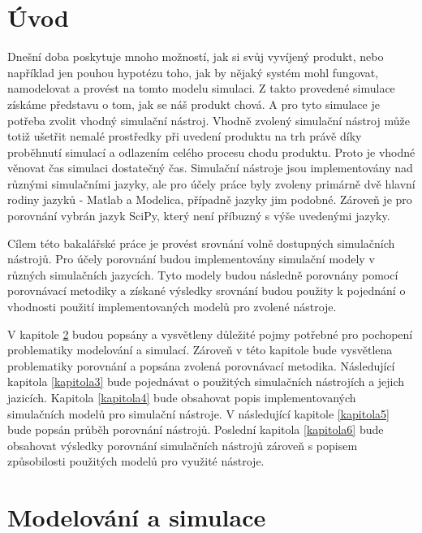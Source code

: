 \chapter{Úvod}

Dnešní doba poskytuje mnoho možností, jak si svůj vyvíjený produkt, nebo například jen pouhou hypotézu toho, jak by nějaký systém mohl fungovat, namodelovat a provést na tomto modelu simulaci. Z takto provedené simulace získáme představu o tom, jak se náš produkt chová. A pro tyto simulace je potřeba zvolit vhodný simulační nástroj. Vhodně zvolený simulační nástroj může totiž ušetřit nemalé prostředky při uvedení produktu na trh právě díky proběhnutí simulací a odlazením celého procesu chodu produktu. Proto je vhodné věnovat čas simulaci dostatečný čas. Simulační nástroje jsou implementovány nad různými simulačními jazyky, ale pro účely práce byly zvoleny primárně dvě hlavní rodiny jazyků - Matlab a Modelica, případně jazyky jim podobné. Zároveň je pro porovnání vybrán jazyk SciPy, který není příbuzný s výše uvedenými jazyky.

Cílem této bakalářské práce je provést srovnání volně dostupných simulačních nástrojů. Pro účely porovnání budou implementovány simulační modely v různých simulačních jazycích. Tyto modely budou následně porovnány pomocí porovnávací metodiky a získané výsledky srovnání budou použity k pojednání o vhodnosti použití implementovaných modelů pro zvolené nástroje.

V kapitole \ref{kapitola2} budou popsány a vysvětleny důležité pojmy potřebné pro pochopení problematiky modelování a simulací. Zároveň v této kapitole bude vysvětlena problematiky porovnání a popsána zvolená porovnávací metodika. Následující kapitola \ref{kapitola3} bude pojednávat o použitých simulačních nástrojích a jejich jazicích. Kapitola \ref{kapitola4} bude obsahovat popis implementovaných simulačních modelů pro simulační nástroje. V následující kapitole \ref{kapitola5} bude popsán průběh porovnání nástrojů. Poslední kapitola \ref{kapitola6} bude obsahovat výsledky porovnání simulačních nástrojů zároveň s popisem způsobilosti použitých modelů pro využité nástroje.

\chapter{Modelování a simulace}
\label{kapitola2}


